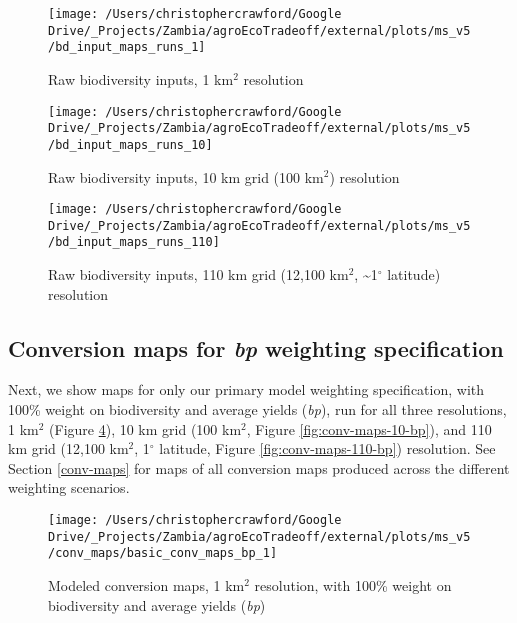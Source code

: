 \documentclass[
]{article}
\begin{document}
\begin{figure}
\texttt{[image: /Users/christophercrawford/Google Drive/\_Projects/Zambia/agroEcoTradeoff/external/plots/ms\_v5/bd\_input\_maps\_runs\_1]} \caption{Raw biodiversity inputs, 1 km\(^2\) resolution}\label{fig:bd-inputs-1}
\end{figure}

\begin{figure}
\texttt{[image: /Users/christophercrawford/Google Drive/\_Projects/Zambia/agroEcoTradeoff/external/plots/ms\_v5/bd\_input\_maps\_runs\_10]} \caption{Raw biodiversity inputs, 10 km grid (100 km\(^2\)) resolution}\label{fig:bd-inputs-10}
\end{figure}

\begin{figure}
\texttt{[image: /Users/christophercrawford/Google Drive/\_Projects/Zambia/agroEcoTradeoff/external/plots/ms\_v5/bd\_input\_maps\_runs\_110]} \caption{Raw biodiversity inputs, 110 km grid (12,100 km\(^2\), \textasciitilde1\(^{\circ}\) latitude) resolution}\label{fig:bd-inputs-110}
\end{figure}

\hypertarget{conversion-maps-for-bp-weighting-specification}{%
\subsection{\texorpdfstring{Conversion maps for \emph{bp} weighting specification}{Conversion maps for bp weighting specification}}\label{conversion-maps-for-bp-weighting-specification}}

Next, we show maps for only our primary model weighting specification, with 100\% weight on biodiversity and average yields (\emph{bp}), run for all three resolutions, 1 km\(^2\) (Figure \ref{fig:conv-maps-1-bp}), 10 km grid (100 km\(^2\), Figure \ref{fig:conv-maps-10-bp}), and 110 km grid (12,100 km\(^2\), 1\(^{\circ}\) latitude, Figure \ref{fig:conv-maps-110-bp}) resolution. See Section \ref{conv-maps} for maps of all conversion maps produced across the different weighting scenarios.





\begin{figure}
\texttt{[image: /Users/christophercrawford/Google Drive/\_Projects/Zambia/agroEcoTradeoff/external/plots/ms\_v5/conv\_maps/basic\_conv\_maps\_bp\_1]} \caption{Modeled conversion maps, 1 km\(^2\) resolution, with 100\% weight on biodiversity and average yields (\emph{bp})}\label{fig:conv-maps-1-bp}
\end{figure}
\end{document}
